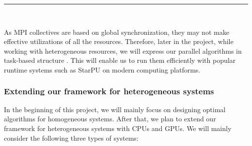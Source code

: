\documentclass[a4paper,11pt]{article}
\newcommand{\todo}[1]{{\color{red}\rule[-.1cm]{.4cm}{.4cm}~~{
			\color{red}{TODO: #1}}}\xspace}
\begin{document}
	
	\todo{Clarify how much is expected from the postdoc here.}
	As MPI collectives are based on global synchronization, they may not make effective utilizations of all the resources. Therefore, later in the project, while working with heterogeneous resources, we will express our parallel algorithms in task-based structure . This will enable us to run them efficiently with popular  runtime systems such as StarPU on modern computing platforms.
	  
	
	
	\subsubsection*{Extending our framework for heterogeneous systems}
	In the beginning of this project, we will mainly focus on designing optimal algorithms for homogeneous systems. After that, we plan to extend our framework for heterogeneous systems with CPUs and GPUs. We will mainly consider the following three types of systems:
	
\end{document}
